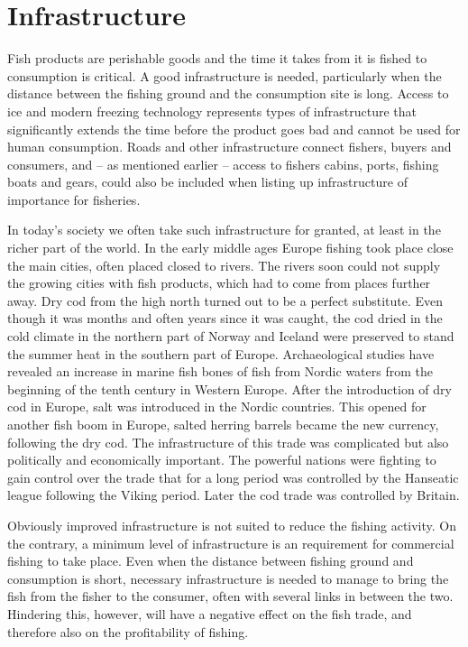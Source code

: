 \documentclass[11pt,fleqn]{book} %
\begin{document}
\section{Infrastructure}

Fish products are perishable goods and the time it takes from it is fished  to consumption is critical. A good infrastructure is needed, particularly when the distance between the fishing ground and the consumption site is long. Access to ice and modern freezing technology represents types of infrastructure that significantly extends the time before the product goes bad and cannot be used for human consumption. Roads and other infrastructure connect fishers, buyers and consumers, and -- as mentioned earlier -- access to fishers cabins, ports, fishing boats and gears, could also be included when listing up infrastructure of importance for fisheries.

In today's society we often take such infrastructure for granted, at least in the richer part of the world. In the early middle ages Europe fishing took place close the main cities, often placed closed to rivers. The rivers soon could not supply the growing cities with fish products, which had to come from places further away. Dry cod from the high north turned out to be a perfect substitute. Even though it was months and often years since it was caught, the cod dried in the cold climate in the northern part of Norway and Iceland were preserved to stand the summer heat in the southern part of Europe. Archaeological studies have revealed an increase in marine fish bones of fish from Nordic waters from the beginning of the tenth century in Western Europe\cite{Barrett2011}. After the introduction of dry cod in Europe, salt was introduced in the Nordic countries. This opened for another fish boom in Europe, salted herring barrels became the new currency, following the dry cod. The infrastructure of this trade was complicated but also politically and economically important. The powerful nations were fighting to gain control over the trade that for a long period was controlled by the Hanseatic league following the Viking period. Later the cod trade was controlled by Britain\cite{Eide2008}.

Obviously improved infrastructure is not suited to reduce the fishing activity. On the contrary, a minimum level of infrastructure is an requirement for commercial fishing to take place. Even when the distance between fishing ground and consumption is short, necessary infrastructure is needed to manage to bring the fish from the fisher to the consumer, often with several links in between the two. Hindering this, however, will have a negative effect on the fish trade, and therefore also on the profitability of fishing.
\end{document}
